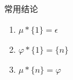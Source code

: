 \begin{frame}{常用结论}
	\begin{enumerate}
		\item<1-> \(\mu*\{1\}=\epsilon\)
		\item<2-> \(\varphi*\{1\}=\{n\}\)
		\item<3-> \(\mu*\{n\}=\varphi\)
	\end{enumerate}
\end{frame}

